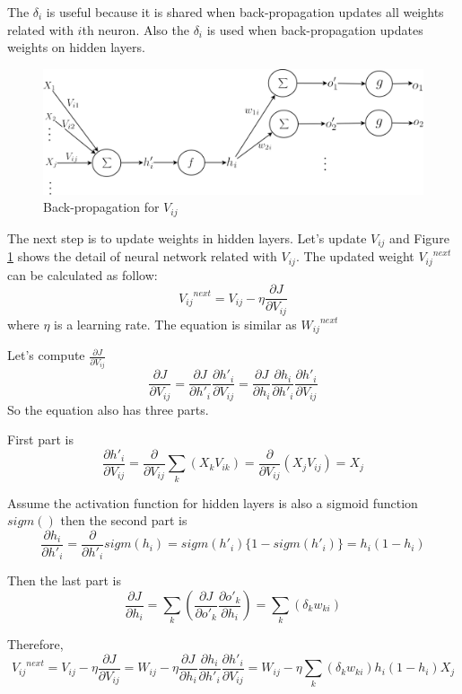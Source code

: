 \documentclass[draft,dvipsnames]{drexel-thesis}
\begin{document}
\begin{thesis}
The $\delta_i$ is useful because it is shared when back-propagation updates all weights related with $i$th neuron. Also the $\delta_i$ is used when back-propagation updates weights on hidden layers.

\begin{figure}[t!]
    \centering
    \includegraphics[width=\textwidth]{pictures/figures/BP2.png}
    \caption{Back-propagation for $V_{ij}$}
    \label{fig:BP2}
\end{figure}

The next step is to update weights in hidden layers. Let's update $V_{ij}$ and Figure \ref{fig:BP2} shows the detail of neural network related with $V_{ij}$. The updated weight ${{V_{ij}}^{next}}$ can be calculated as follow:
$${{V_{ij}}^{next}}=V_{ij} - \eta\frac{\partial J}{\partial V_{ij}}$$ where $\eta$ is a learning rate. The equation is similar as ${{W_{ij}}^{next}}$

Let's compute $\frac{\partial J}{\partial V_{ij}}$
$$
\frac{\partial J}{\partial V_{ij}}
= \frac{\partial J}{\partial h'_i}\frac{\partial h'_i}{\partial V_{ij}}
= \frac{\partial J}{\partial h_i}\frac{\partial h_i}{\partial h'_i}\frac{\partial h'_i}{\partial V_{ij}}
$$
So the equation also has three parts.

First part is
$$
\frac{\partial h'_i}{\partial V_{ij}}
= \frac{\partial}{\partial V_{ij}}\sum_k(X_kV_{ik})
= \frac{\partial}{\partial V_{ij}}(X_jV_{ij})
= X_j
$$

Assume the activation function for hidden layers is also a sigmoid function $sigm()$ then the second part is
$$
\frac{\partial h_i}{\partial h'_i}
= \frac{\partial}{\partial h'_i}sigm(h_i)
= sigm(h'_i)\{1-sigm(h'_i)\}
= h_i(1-h_i)
$$

Then the last part is
$$
\frac{\partial J}{\partial h_i}
= \sum_k(\frac{\partial J}{\partial o'_k}\frac{\partial o'_k}{\partial h_i})
= \sum_k(\delta_kw_{ki})
$$

Therefore,
$$
{{V_{ij}}^{next}}
= V_{ij} - \eta\frac{\partial J}{\partial V_{ij}}
= W_{ij} - \eta\frac{\partial J}{\partial h_i}\frac{\partial h_i}{\partial h'_i}\frac{\partial h'_i}{\partial V_{ij}}
= W_{ij} - \eta\sum_k(\delta_kw_{ki})h_i(1-h_i)X_j
$$


\end{thesis}
\end{document}
